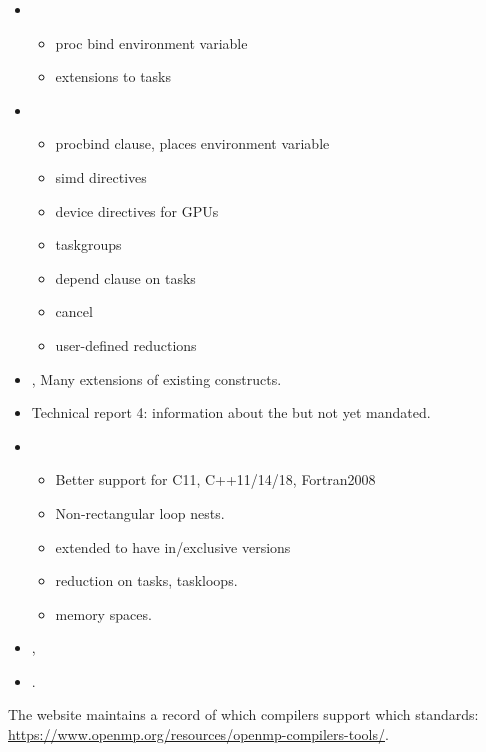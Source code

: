 \begin{itemize}
\item {}
  \begin{itemize}
  \item proc bind environment variable
  \item extensions to tasks
  \end{itemize}
\item {}
  \begin{itemize}
  \item procbind clause, places environment variable
  \item simd directives
  \item device directives for GPUs
  \item taskgroups
  \item depend clause on tasks
  \item cancel
  \item user-defined reductions
  \end{itemize}
\item {} ,
  Many extensions of existing constructs.
\item {} Technical report 4: information about the 
  but not yet mandated.
\item {} 
  \begin{itemize}
  \item Better support for C11, C++11/14/18, Fortran2008
  \item Non-rectangular loop nests.
  \item {} extended to have in/exclusive versions
  \item reduction on tasks, taskloops.
  \item memory spaces.
  \end{itemize}
\item {} ,
\item {} .
\end{itemize}

\begin{multicols}{2}
\end{multicols}

The  website maintains a record of which compilers
support which standards: \url{https://www.openmp.org/resources/openmp-compilers-tools/}.


